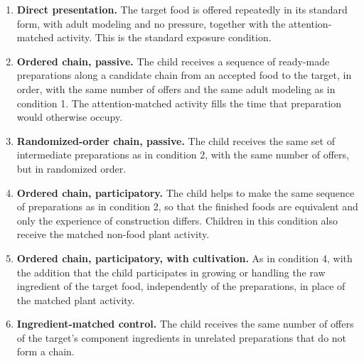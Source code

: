 \documentclass[11pt]{article}
\theoremstyle{remark}
\begin{document}
\begin{enumerate}[leftmargin=2em,itemsep=2pt]
\item \textbf{Direct presentation.} The target food is offered repeatedly in its standard form, with adult modeling and no pressure, together with the attention-matched activity. This is the standard exposure condition.
\item \textbf{Ordered chain, passive.} The child receives a sequence of ready-made preparations along a candidate chain from an accepted food to the target, in order, with the same number of offers and the same adult modeling as in condition 1. The attention-matched activity fills the time that preparation would otherwise occupy.
\item \textbf{Randomized-order chain, passive.} The child receives the same set of intermediate preparations as in condition 2, with the same number of offers, but in randomized order.
\item \textbf{Ordered chain, participatory.} The child helps to make the same sequence of preparations as in condition 2, so that the finished foods are equivalent and only the experience of construction differs. Children in this condition also receive the matched non-food plant activity.
\item \textbf{Ordered chain, participatory, with cultivation.} As in condition 4, with the addition that the child participates in growing or handling the raw ingredient of the target food, independently of the preparations, in place of the matched plant activity.
\item \textbf{Ingredient-matched control.} The child receives the same number of offers of the target's component ingredients in unrelated preparations that do not form a chain.
\end{enumerate}
\end{document}
